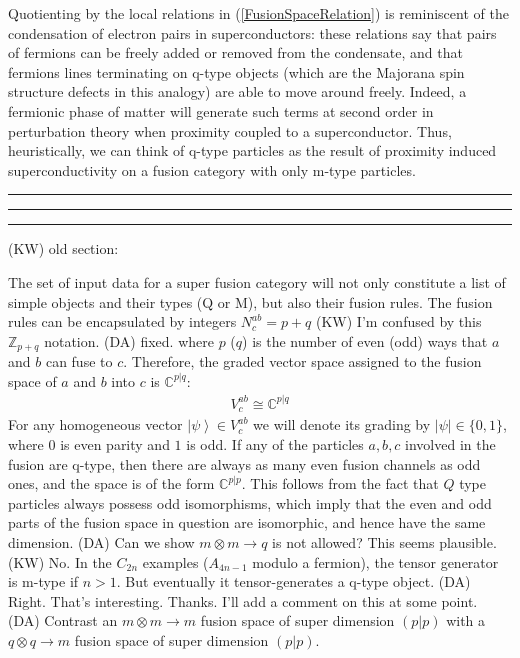 \documentclass[12pt,a4paper]{article}
\newcounter{arrow}
\newcommand{\tp}{\otimes}
\newcommand{\zz}{\mathbb{Z}}
\newcommand{\ket}[1]{\ensuremath{\left|#1\right\rangle}}
\newcommand{\dave}[1]{{\color{ao(english)}\footnotesize{(DA) #1}}}
\newcommand{\kw}[1]{{\color{kwcolor}\footnotesize{(KW) #1}}}
\newcommand{\kwsep}{\bigskip\hrule\medskip\hrule\medskip\hrule\bigskip}
\begin{document}
Quotienting by the local relations in (\ref{FusionSpaceRelation}) is reminiscent of the condensation of electron pairs in superconductors: these relations say that pairs of fermions can be freely added or removed from the condensate, and that fermions lines terminating on q-type objects (which are the Majorana spin structure defects in this analogy) are able to move around freely. 
Indeed, a fermionic phase of matter will generate such terms at second order in perturbation theory when proximity coupled to a superconductor.
Thus, heuristically, we can think of q-type particles as the result of proximity induced superconductivity on a fusion category with only m-type particles.


\kwsep

\kw{old section:}

The set of input data for a super fusion category will not only constitute a list of simple objects and their types (Q or M), but also their fusion rules. 
The fusion rules can be encapsulated by integers $N_c^{ab} = p+q$ 
\kw{I'm confused by this $\zz_{p+q}$ notation.}
\dave{fixed.}
where $p$ ($q$) is the number of even (odd) ways that $a$ and $b$ can fuse to $c$.
Therefore, the graded vector space assigned to the fusion space of $a$ and $b$ into $c$ is $\mathbb{C}^{p|q}$:
\begin{align}
V^{ab}_c \cong \mathbb{C}^{p|q}
\end{align}
For any homogeneous vector $\ket{\psi} \in V^{ab}_c$ 
we will denote its grading by $|\psi| \in \{ 0, 1\}$, where $0$ is even parity and $1$ is odd.
If any of the particles $a,b,c$ involved in the fusion are q-type, then there are always as many even fusion channels as odd ones, and the space is of the form $\mathbb{C}^{p|p}$.
This follows from the fact that $Q$ type particles always possess odd isomorphisms, which imply that the even and odd parts of the fusion space in question are isomorphic, and hence have the same dimension. 
\dave{Can we show $m \tp m \rightarrow q$ is not allowed? This seems plausible.}
\kw{No.  In the $C_{2n}$ examples ($A_{4n-1}$ modulo a fermion), the tensor generator is m-type if $n > 1$.
But eventually it tensor-generates a q-type object.}
\dave{Right. That's interesting. Thanks. I'll add a comment on this at some point.}
\dave{Contrast an $m \tp m \rightarrow m$ fusion space of super dimension $(p|p)$ with a $q \tp q \rightarrow m$ fusion space of super dimension $(p|p)$.}
\end{document}
